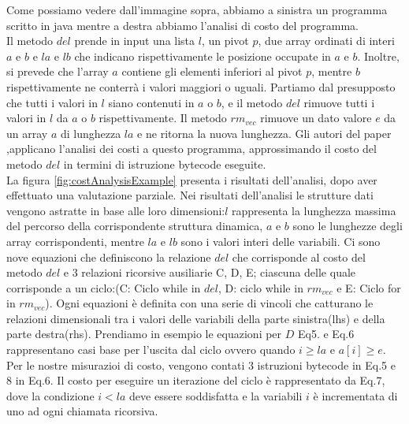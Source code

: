 \documentclass[../../main.tex]{subfiles}
\begin{document}
Come possiamo vedere dall'immagine sopra, abbiamo a sinistra un programma scritto in java mentre a destra abbiamo l'analisi di costo del programma.\\
Il metodo $del$ prende in input una lista $l$, un pivot $p$, due array ordinati di interi $a$ e $b$ e $la$ e $lb$ che indicano rispettivamente le posizione occupate in $a$ e $b$.
Inoltre, si prevede che l'array $a$ contiene gli elementi inferiori al pivot $p$, mentre $b$ rispettivamente ne conterrà i valori maggiori o uguali.
Partiamo dal presupposto che tutti i valori in $l$ siano contenuti in $a$ o $b$, e il metodo $del$ rimuove tutti i valori in $l$ da $a$ o $b$ rispettivamente.
Il metodo $rm_{vec}$ rimuove un dato valore $e$ da un array $a$ di lunghezza $la$ e ne ritorna la nuova lunghezza.
Gli autori del paper \autocite{albert2008automatic},applicano l'analisi dei costi a questo programma, approssimando il costo del metodo $del$ in termini di istruzione bytecode eseguite.\\
La figura \ref{fig:costAnalysisExample} presenta i risultati dell'analisi, dopo aver effettuato una valutazione parziale.
Nei risultati dell'analisi le strutture dati vengono astratte in base alle loro dimensioni:$l$ rappresenta la lunghezza massima del percorso della corrispondente struttura dinamica, $a$ e $b$ sono le lunghezze degli array corrispondenti, mentre $la$ e $lb$ sono i valori interi delle variabili.
Ci sono nove equazioni che definiscono la relazione $ del $ che corrisponde al costo del metodo $del$ e 3 relazioni ricorsive ausiliarie C, D, E; ciascuna delle quale corrisponde a un ciclo:(C: Ciclo while in $del$, D: ciclo while in $rm_{vec}$ e E: Ciclo for in $rm_{vec}$).
Ogni equazioni è definita con una serie di vincoli che catturano le relazioni dimensionali tra i valori delle variabili della parte sinistra(lhs) e della parte destra(rhs).
Prendiamo in esempio le equazioni per $D$ Eq5. e Eq.6 rappresentano casi base per l'uscita dal ciclo ovvero quando $i \geq la$ e $a[i]\geq e$.
Per le nostre misurazioi di costo, vengono contati 3 istruzioni bytecode in Eq.5 e 8 in Eq.6.
Il costo per eseguire un iterazione del ciclo è rappresentato da Eq.7, dove la condizione $i < la$ deve essere soddisfatta e la variabili $i$ è incrementata di uno ad ogni chiamata ricorsiva.
\end{document}
